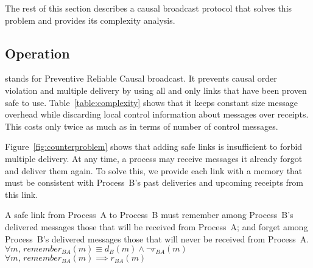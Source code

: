 The rest of this section describes a causal broadcast protocol that solves this
problem and provides its complexity analysis.


\subsection{Operation}

\RPCBROADCAST stands for Preventive Reliable Causal broadcast. It prevents
causal order violation and multiple delivery by using all and only links that
have been proven safe to use. Table~\ref{table:complexity} shows that it keeps
constant size message overhead while discarding local control information about
messages over receipts. This costs only twice as much as \PCBROADCAST in terms
of number of control messages.

Figure~\ref{fig:counterproblem} shows that adding safe links is insufficient to
forbid multiple delivery. At any time, a process may receive messages it already
forgot and deliver them again. To solve this, we provide each link with a memory
that must be consistent with Process~B's past deliveries and upcoming receipts
from this link.



\begin{definition}
  A safe link from Process~A to Process~B must remember among Process~B's
  delivered messages those that will be received from Process~A; and forget
  among Process~B's delivered messages those that will never be received from
  Process~A.\\
  $\forall m,\, remember_{BA}(m) \equiv d_B(m) \wedge \neg r_{BA}(m)$ \\
  $\forall m,\, remember_{BA}(m) \implies r_{BA}(m)$
\end{definition}



